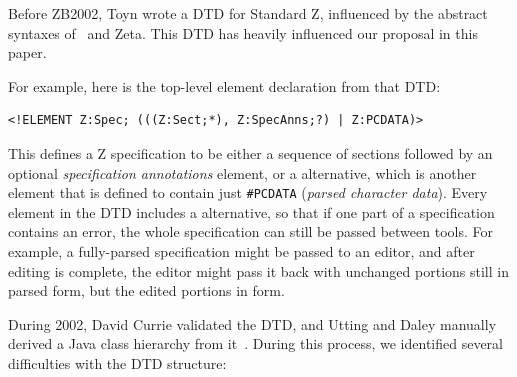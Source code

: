 \documentclass{llncs}  %
\newcommand{\Zeta}{Zeta}
\begin{document}
Before ZB2002, Toyn wrote a DTD for Standard Z, influenced by the
abstract syntaxes of \CADiZ\ and \Zeta.  This DTD has heavily influenced our
proposal in this paper. 

For example, here is the top-level element declaration from that DTD:
\begin{small}
\begin{verbatim}
<!ELEMENT Z:Spec; (((Z:Sect;*), Z:SpecAnns;?) | Z:PCDATA)>
\end{verbatim}
\end{small}

This defines a Z specification to be either a sequence of sections
followed by an optional \emph{specification annotations} element, or a
 alternative, which is another element that is defined 
to contain just \verb!#PCDATA! (\textit{parsed character data}).
Every element in the DTD includes a  alternative, so
that if one part of a specification contains an error, the whole
specification can still be passed between tools.  For example,
a fully-parsed specification might be passed to an editor, and after
editing is complete, the editor might pass it back with unchanged
portions still in parsed form, but the edited portions in 
form. 

During 2002, David Currie validated the DTD, and Utting and Daley
manually derived a Java class hierarchy from it~\cite{daley:report02}.
During this process, we identified several difficulties with the
DTD structure:
\end{document}
